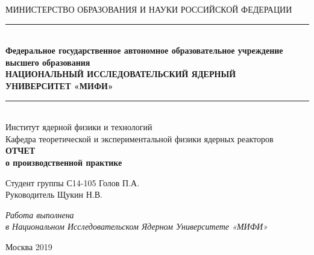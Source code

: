 \begin{center} 

\small МИНИСТЕРСТВО ОБРАЗОВАНИЯ И НАУКИ РОССИЙСКОЙ ФЕДЕРАЦИИ\\
\noindent\rule{13.9cm}{0.4pt}\\
\textbf{\footnotesize Федеральное государственное автономное образовательное учреждение высшего образования}\\[0.3cm]
\textbf{НАЦИОНАЛЬНЫЙ ИССЛЕДОВАТЕЛЬСКИЙ ЯДЕРНЫЙ \\УНИВЕРСИТЕТ «МИФИ»}\\
\noindent\rule{13.9cm}{0.4pt}\\[0.6cm]

Институт ядерной физики и технологий\\[0.6cm]

Кафедра теоретической и экспериментальной физики ядерных реакторов\\[2.4cm]
\textbf{\LARGE ОТЧЕТ}\\[0.6cm]
\textbf{\large о производственной практике}\\[3.6cm]
\end{center} 

Студент группы С14-105 \hspace{2.1cm} \underline{\hspace{4.2cm}} Голов П.А.\\[0.6cm]

Руководитель \hspace{4.5cm} \underline{\hspace{4.2cm}} Щукин Н.В.\\[1.2cm]

\begin{center} 
\textit{Работа выполнена\\
в Национальном Исследовательском Ядерном Университете «МИФИ»}

\vfill 


\large Москва 2019
\end{center} 

\thispagestyle{empty}